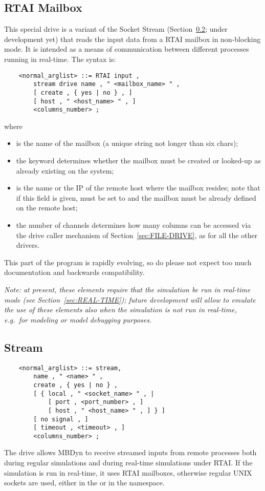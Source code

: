 \subsection{RTAI Mailbox}\label{sec:RTAI_in}
This special drive is a variant of the Socket Stream
(Section~\ref{sec:Stream}; under development yet)
that reads the input data from a RTAI mailbox in non-blocking mode.
It is intended as a means of communication between different processes
running in real-time.
The syntax is:
\begin{verbatim}
    <normal_arglist> ::= RTAI input ,
        stream drive name , " <mailbox_name> " ,
        [ create , { yes | no } , ]
        [ host , " <host_name> " , ]
        <columns_number> ;
\end{verbatim}
where
\begin{itemize}
\item {} is the name of the mailbox (a unique string 
not longer than six chars);
\item the  keyword determines whether the mailbox 
must be created or looked-up as already existing on the system;
\item {} is the name or the IP of the remote host where 
the mailbox resides; note that if this field is given,  must
be set to  and the mailbox must be already defined
on the remote host;
\item the number of channels  determines how many
columns can be accessed via the  drive caller mechanism 
of Section~\ref{sec:FILE-DRIVE}, as for all the other  drivers.
\end{itemize}
This part of the program is rapidly evolving, so do please not expect
too much documentation and backwards compatibility.

\emph{Note: at present, these elements require that the simulation
be run in real-time mode (see Section~\ref{sec:REAL-TIME});
future development will allow to emulate the use of these elements
also when the simulation is not run in real-time, e.g.\ for modeling
or model debugging purposes.}



\subsection{Stream}\label{sec:Stream}
\begin{verbatim}
    <normal_arglist> ::= stream,
        name , " <name> " ,
        create , { yes | no } ,
        [ { local , " <socket_name> " , |
            [ port , <port_number> , ]
            [ host , " <host_name> " , ] } ]
        [ no signal , ]
        [ timeout , <timeout> , ]
        <columns_number> ;
\end{verbatim}
The  drive allows MBDyn to receive streamed inputs 
from remote processes both during regular simulations and during 
real-time simulations under RTAI.
If the simulation is run in real-time, it uses RTAI mailboxes, 
otherwise regular UNIX sockets are used, either in the  or 
in the  namespace.

